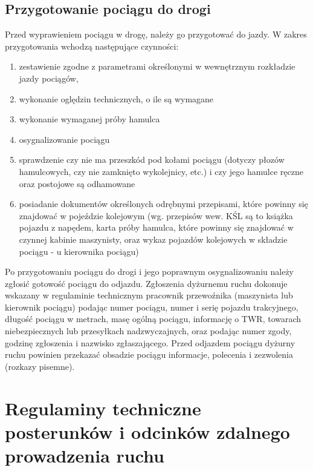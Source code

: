 \section{Przygotowanie pociągu do drogi}

Przed wyprawieniem pociągu w drogę, należy go przygotować do jazdy. W zakres przygotowania wchodzą następujące czynności:

\begin{enumerate}
\item zestawienie zgodne z parametrami określonymi w wewnętrznym rozkładzie jazdy pociągów,
\item wykonanie oględzin technicznych, o ile są wymagane
\item wykonanie wymaganej próby hamulca
\item osygnalizowanie pociągu
\item sprawdzenie czy nie ma przeszkód pod kołami pociągu (dotyczy płozów hamulcowych, czy nie zamknięto wykolejnicy,
etc.) i czy jego hamulce ręczne oraz postojowe są odhamowane
\item posiadanie dokumentów określonych odrębnymi przepisami, które powinny się znajdować w pojeździe kolejowym (wg. przepisów wew. KŚL są to książka pojazdu z napędem, karta próby hamulca, które powinny się znajdować w czynnej kabinie maszynisty, oraz wykaz pojazdów kolejowych w składzie pociągu - u kierownika pociągu)
\end{enumerate}
Po przygotowaniu pociągu do drogi i jego poprawnym osygnalizowaniu należy zgłosić gotowość pociągu do odjazdu. Zgłoszenia dyżurnemu ruchu dokonuje wskazany w regulaminie technicznym pracownik przewoźnika (maszynista lub kierownik pociągu) podając numer pociągu, numer i serię pojazdu trakcyjnego, długość pociągu w metrach, masę ogólną pociągu, informację o TWR, towarach niebezpiecznych lub przesyłkach nadzwyczajnych, oraz podając numer zgody, godzinę zgłoszenia i nazwisko zgłaszającego. Przed odjazdem pociągu dyżurny ruchu powinien przekazać obsadzie pociągu informacje, polecenia i zezwolenia (rozkazy pisemne).

\chapter{Regulaminy techniczne posterunków i odcinków zdalnego prowadzenia ruchu}

